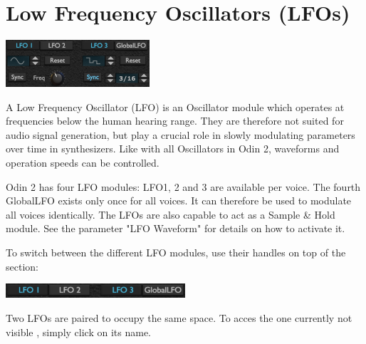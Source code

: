 


\section{Low Frequency Oscillators (LFOs)}
\label{LFOs}

\begin{center}
    \includegraphics[width=0.4\textwidth]{graphics/LFOs.png}
\end{center}

A Low Frequency Oscillator (LFO) is an Oscillator module which operates at frequencies below the human hearing range. They are therefore not suited for audio signal generation, but play a crucial role in slowly modulating parameters over time in synthesizers. Like with all Oscillators in Odin 2, waveforms and operation speeds can be controlled.

Odin 2 has four LFO modules: LFO1, 2 and 3 are available per voice. The fourth GlobalLFO exists only once for all voices. It can therefore be used to modulate all voices identically. The LFOs are also capable to act as a Sample \& Hold module. See the parameter "LFO Waveform" for details on how to activate it.

To switch between the different LFO modules, use their handles on top of the section:
\begin{center}
    \includegraphics[width=0.5\textwidth]{graphics/LFO_handles.png}
\end{center}
Two LFOs are paired to occupy the same space. To acces the one currently not visible , simply click on its name.

